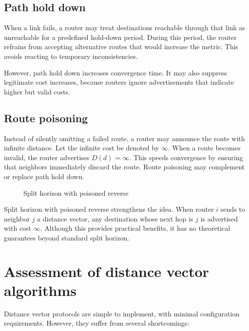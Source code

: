 \subsection{Path hold down}

When a link fails, a router may treat destinations reachable through that link as unreachable for a predefined hold-down period. During this period, the router refrains from accepting alternative routes that would increase the metric. This avoids reacting to temporary inconsistencies.


\begin{center}
\end{center}


However, path hold down increases convergence time. It may also suppress legitimate cost increases, because routers ignore advertisements that indicate higher but valid costs.

\subsection{Route poisoning}

Instead of silently omitting a failed route, a router may announce the route with infinite distance. Let the infinite cost be denoted by $\infty$. When a route becomes invalid, the router advertises $D(d)$ = $\infty$. This speeds convergence by ensuring that neighbors immediately discard the route. Route poisoning may complement or replace path hold down.

\begin{figure}[htbp]
	\centering
	\caption{Split horizon with poisoned reverse}
	\label{fig:split_horizon_poisoned}
\end{figure}

Split horizon with poisoned reverse strengthens the idea. When router $i$ sends to neighbor $j$ a distance vector, any destination whose next hop is $j$ is advertised with cost $\infty$. Although this provides practical benefits, it has no theoretical guarantees beyond standard split horizon.

\section{Assessment of distance vector algorithms}

Distance vector protocols are simple to implement, with minimal configuration requirements. However, they suffer from several shortcomings:

